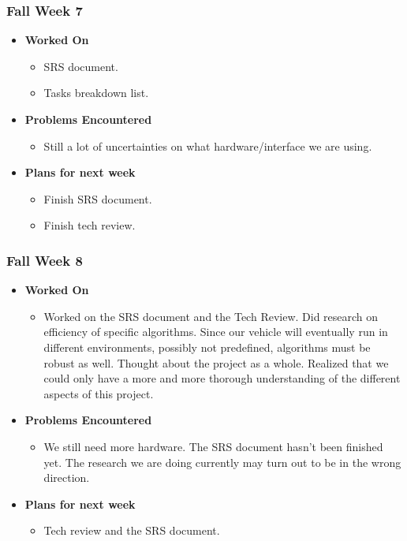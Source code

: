 \documentclass[compsoc,draftclsnofoot,onecolumn,10pt]{IEEEtran}
\begin{document}
\subsubsection{Fall Week 7}
\begin{itemize}
    \item {\textbf{Worked On}}
    \begin{itemize}
      \item SRS document.
      \item Tasks breakdown list.
    \end{itemize}

    \item {\textbf{Problems Encountered}}
    \begin{itemize}
      \item Still a lot of uncertainties on what hardware/interface we are using.
    \end{itemize}

    \item{\textbf{Plans for next week}}
    \begin{itemize}
      \item Finish SRS document.
      \item Finish tech review.
    \end{itemize}

\end{itemize}

\subsubsection{Fall Week 8}
\begin{itemize}
    \item {\textbf{Worked On}}
    \begin{itemize}
      \item Worked on the SRS document and the Tech Review. Did research on
      efficiency of specific algorithms. Since our vehicle will eventually
      run in different environments, possibly not predefined, algorithms
      must be robust as well. Thought about the project as a whole. Realized
      that we could only have a more and more thorough understanding of the
      different aspects of this project.
    \end{itemize}

    \item {\textbf{Problems Encountered}}
    \begin{itemize}
      \item We still need more hardware. The SRS document hasn't been
      finished yet. The research we are doing currently may turn out to be
      in the wrong direction.
    \end{itemize}

    \item{\textbf{Plans for next week}}
    \begin{itemize}
      \item Tech review and the SRS document.
    \end{itemize}

\end{itemize}
\end{document}
